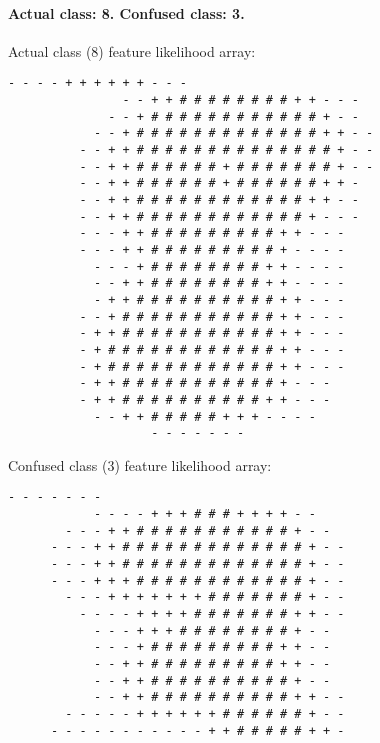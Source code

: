 \begin{multicols*}{2}
\paragraph{Actual class: 8. Confused class: 3. \\}
Actual class (8) feature likelihood array:
\begin{Verbatim}[samepage=true]
                    - - - - + + + + + + - - -           
                - - + + # # # # # # # # + + - - -       
              - - + # # # # # # # # # # # # + - -       
            - - + # # # # # # # # # # # # # + + - -     
          - - + + # # # # # # # # # # # # # # + - -     
          - - + + # # # # # # + # # # # # # # + - -     
          - - + + # # # # # # + # # # # # # + + -       
          - - + + # # # # # # # # # # # # + + - -       
          - - + + # # # # # # # # # # # # + - - -       
          - - - + + # # # # # # # # # + + - - -         
          - - - + + # # # # # # # # # + - - - -         
            - - - + # # # # # # # # + + - - - -         
            - - + + # # # # # # # # + + - - - -         
            - + + # # # # # # # # # # + + - - -         
          - - + # # # # # # # # # # # + + - - -         
          - + + # # # # # # # # # # # + + - - -         
          - + # # # # # # # # # # # # + + - - -         
          - + # # # # # # # # # # # # + + - - -         
          - + + # # # # # # # # # # # + - - -           
          - + + # # # # # # # # # # + + - - -           
            - - + + # # # # # + + + - - - -             
                    - - - - - - -                       
\end{Verbatim}
Confused class (3) feature likelihood array:
\begin{Verbatim}[samepage=true]
                      - - - - - - -                     
            - - - - + + + # # # + + + + - -             
        - - - + + # # # # # # # # # # # + - -           
      - - - + + # # # # # # # # # # # # # + - -         
      - - - + + # # # # # # # # # # # # # + - -         
      - - - + + + # # # # # # # # # # # # + - -         
        - - - + + + + + + + # # # # # # # + - -         
          - - - - + + + + # # # # # # # + + - -         
            - - - + + + # # # # # # # # + - -           
            - - - + # # # # # # # # # + + - -           
            - - + + # # # # # # # # # + + - -           
            - - + + # # # # # # # # # # + - -           
            - - + + # # # # # # # # # # + + - -         
        - - - - - + + + + + + # # # # # # + - -         
      - - - - - - - - - - - + + # # # # # + + -         

\end{Verbatim}
\end{multicols*}
